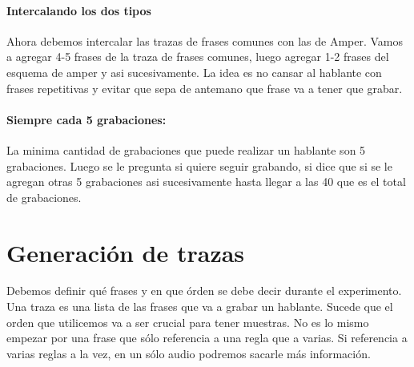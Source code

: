 \documentclass[11pt,a4paper,twoside]{tesis}
\begin{document}
\paragraph{Intercalando los dos tipos}

Ahora debemos intercalar las trazas de frases comunes con las de Amper. Vamos a agregar 4-5 frases de la traza de frases comunes, luego agregar 1-2 frases del esquema de amper y asi sucesivamente. La idea es no cansar al hablante con frases repetitivas y evitar que sepa de antemano que frase va a tener que grabar.

\paragraph{Siempre cada 5 grabaciones:}
La minima cantidad de grabaciones que puede realizar un hablante son 5 grabaciones. Luego se le pregunta si quiere seguir grabando, si dice que si se le agregan otras 5 grabaciones asi sucesivamente hasta llegar a las 40 que es el total de grabaciones.

\section{Generación de trazas}



Debemos definir qué frases y en que órden se debe decir durante el experimento. Una traza es una lista de las frases que va a grabar un hablante. Sucede que el orden que utilicemos va a ser crucial para tener muestras. No es lo mismo empezar por una frase que sólo referencia a una regla que a varias. Si referencia a varias reglas a la vez, en un sólo audio podremos sacarle más información.
\end{document}
